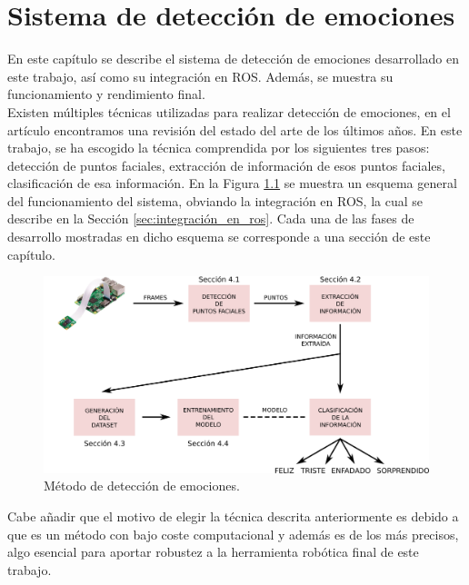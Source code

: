\chapter{Sistema de detección de emociones}
\label{cap:capitulo4}

En este capítulo se describe el sistema de detección de emociones desarrollado en este trabajo, así como su integración en ROS. Además, se muestra su funcionamiento y rendimiento final.\\

Existen múltiples técnicas utilizadas para realizar detección de emociones, en el artículo \cite{literature_review} encontramos una revisión del estado del arte de los últimos años. En este trabajo, se ha escogido la técnica comprendida por los siguientes tres pasos: detección de puntos faciales, extracción de información de esos puntos faciales, clasificación de esa información. En la Figura \ref{fig:metodo} se muestra un esquema general del funcionamiento del sistema, obviando la integración en ROS, la cual se describe en la Sección \ref{sec:integración_en_ros}. Cada una de las fases de desarrollo mostradas en dicho esquema se corresponde a una sección de este capítulo.\\

\begin{figure} [h!]
  \begin{center}
    \includegraphics[width=16cm]{figs/metodo.png}
  \end{center}
  \captionsetup{justification=centering}
  \caption{Método de detección de emociones.}
  \label{fig:metodo}
\end{figure}

Cabe añadir que el motivo de elegir la técnica descrita anteriormente es debido a que es un método con bajo coste computacional y además es de los más precisos, algo esencial para aportar robustez a la herramienta robótica final de este trabajo.

